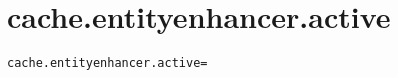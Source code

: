 \section{cache.entityenhancer.active}
\label{configuration:CacheEntityenhancerActive}
\ClearAPI
\TODO%
\begin{lstlisting}[style=Props,caption={Usage example for \textit{cache.entityenhancer.active}}]
cache.entityenhancer.active=
\end{lstlisting}